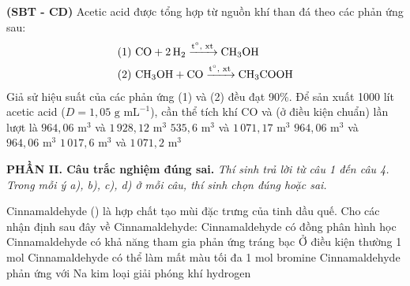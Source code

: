 \documentclass[12pt,a4paper]{article}
\begin{document}
\begin{ex}
\textbf{(SBT - CD)} Acetic acid được tổng hợp từ nguồn khí than đá theo các phản ứng sau:
\begin{align*}
\text{(1) } & \ce{CO + 2H2 ->[{t$^\circ$, xt}] CH3OH} \\
\text{(2) } & \ce{CH3OH + CO ->[{t$^\circ$, xt}] CH3COOH}
\end{align*}
Giả sử hiệu suất của các phản ứng (1) và (2) đều đạt 90\%. Để sản xuất 1000 lít acetic acid ($D = 1,05\text{ g mL}^{-1}$), cần thể tích khí CO và  (ở điều kiện chuẩn) lần lượt là
\choice
{$964,06\text{ m}^3$ và $1\,928,12\text{ m}^3$}
{$535,6\text{ m}^3$ và $1\,071,17\text{ m}^3$}
{$964,06\text{ m}^3$ và $964,06\text{ m}^3$}
{\True $1\,017,6\text{ m}^3$ và $1\,071,2\text{ m}^3$}

\end{ex}

\bigskip
\noindent\textbf{\large PHẦN II. Câu trắc nghiệm đúng sai.}
\textit{Thí sinh trả lời từ câu 1 đến câu 4. Trong mỗi ý a), b), c), d) ở mỗi câu, thí sinh chọn đúng hoặc sai.}
\vspace{0.2cm}

\begin{ex}
Cinnamaldehyde () là hợp chất tạo mùi đặc trưng của tinh dầu quế. Cho các nhận định sau đây về Cinnamaldehyde:
\choiceTF
{\True Cinnamaldehyde có đồng phân hình học}
{\True Cinnamaldehyde có khả năng tham gia phản ứng tráng bạc}
{Ở điều kiện thường 1 mol Cinnamaldehyde có thể làm mất màu tối đa 1 mol bromine}
{Cinnamaldehyde phản ứng với Na kim loại giải phóng khí hydrogen}

\end{ex}
\end{document}
